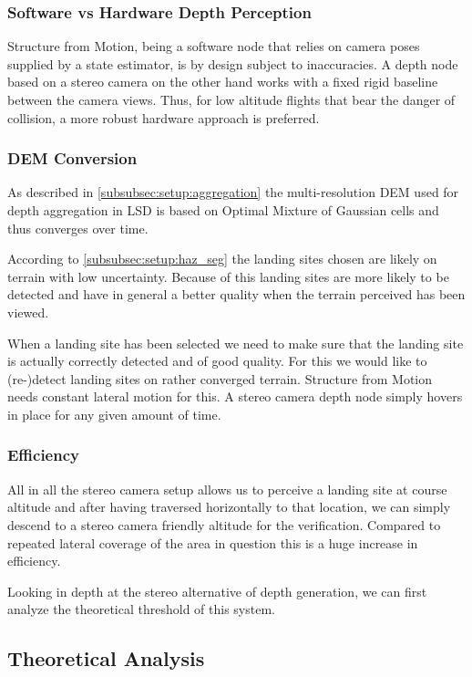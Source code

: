 \subsubsection{Software vs Hardware Depth Perception}

Structure from Motion, being a software node that relies on camera poses supplied by a state estimator, is by design subject to inaccuracies. A depth node based on a stereo camera on the other hand works with a fixed rigid baseline between the camera views. Thus, for low altitude flights that bear the danger of collision, a more robust hardware approach is preferred.

\subsubsection{DEM Conversion}

As described in \cref{subsubsec:setup:aggregation} the multi-resolution DEM used for depth aggregation in LSD is based on Optimal Mixture of Gaussian cells and thus converges over time. 

According to \cref{subsubsec:setup:haz_seg} the landing sites chosen are likely on terrain with low uncertainty. Because of this landing sites are more likely to be detected and have in general a better quality when the terrain perceived has been viewed.

When a landing site has been selected we need to make sure that the landing site is actually correctly detected and of good quality. For this we would like to (re-)detect landing sites on rather converged terrain. Structure from Motion needs constant lateral motion for this. A stereo camera depth node simply hovers in place for any given amount of time.

\subsubsection{Efficiency}

All in all the stereo camera setup allows us to perceive a landing site at course altitude and after having traversed horizontally to that location, we can simply descend to a stereo camera friendly altitude for the verification. Compared to repeated lateral coverage of the area in question this is a huge increase in efficiency.

Looking in depth at the stereo alternative of depth generation, we can first analyze the theoretical threshold of this system.

\subsection{Theoretical Analysis}

